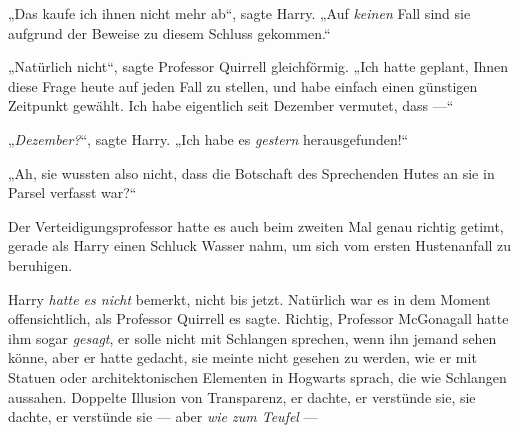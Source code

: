 „Das kaufe ich ihnen nicht mehr ab“, sagte Harry.
„Auf \emph{keinen} Fall sind sie aufgrund der Beweise zu diesem Schluss gekommen.“

„Natürlich nicht“, sagte Professor Quirrell gleichförmig.
„Ich hatte geplant, Ihnen diese Frage heute auf jeden Fall zu stellen, und habe einfach einen günstigen Zeitpunkt gewählt. Ich habe eigentlich seit Dezember vermutet, dass —“

„\emph{Dezember?}“, sagte Harry.
„Ich habe es \emph{gestern} herausgefunden!“

„Ah, sie wussten also nicht, dass die Botschaft des Sprechenden Hutes an sie in Parsel verfasst war?“

Der Verteidigungsprofessor hatte es auch beim zweiten Mal genau richtig getimt, gerade als Harry einen Schluck Wasser nahm, um sich vom ersten Hustenanfall zu beruhigen.

Harry \emph{hatte es nicht} bemerkt, nicht bis jetzt. Natürlich war es in dem Moment offensichtlich, als Professor Quirrell es sagte. Richtig, Professor McGonagall hatte ihm sogar \emph{gesagt}, er solle nicht mit Schlangen sprechen, wenn ihn jemand sehen könne, aber er hatte gedacht, sie meinte nicht gesehen zu werden, wie er mit Statuen oder architektonischen Elementen in Hogwarts sprach, die wie Schlangen aussahen. Doppelte Illusion von Transparenz, er dachte, er verstünde sie, sie dachte, er verstünde sie — aber \emph{wie zum Teufel} —

